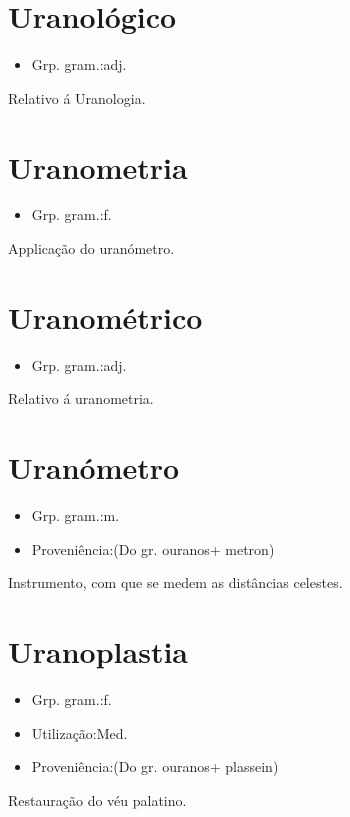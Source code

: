 \documentclass{article}
\begin{document}
\section{Uranológico}
\begin{itemize}
\item {Grp. gram.:adj.}
\end{itemize}
Relativo á Uranologia.
\section{Uranometria}
\begin{itemize}
\item {Grp. gram.:f.}
\end{itemize}
Applicação do uranómetro.
\section{Uranométrico}
\begin{itemize}
\item {Grp. gram.:adj.}
\end{itemize}
Relativo á uranometria.
\section{Uranómetro}
\begin{itemize}
\item {Grp. gram.:m.}
\end{itemize}
\begin{itemize}
\item {Proveniência:(Do gr. \textunderscore ouranos\textunderscore  + \textunderscore metron\textunderscore )}
\end{itemize}
Instrumento, com que se medem as distâncias celestes.
\section{Uranoplastia}
\begin{itemize}
\item {Grp. gram.:f.}
\end{itemize}
\begin{itemize}
\item {Utilização:Med.}
\end{itemize}
\begin{itemize}
\item {Proveniência:(Do gr. \textunderscore ouranos\textunderscore  + \textunderscore plassein\textunderscore )}
\end{itemize}
Restauração do véu palatino.
\end{document}
